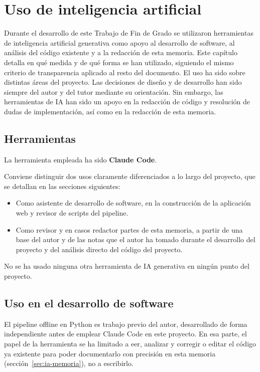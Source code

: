\chapter{Uso de inteligencia artificial}
\label{cap:uso-ia}

Durante el desarrollo de este Trabajo de Fin de Grado se utilizaron
herramientas de inteligencia artificial generativa como apoyo al desarrollo
de software, al análisis del código existente y a la redacción de esta
memoria. Este capítulo detalla en qué medida y de qué forma se
han utilizado, siguiendo el mismo criterio de transparencia aplicado al
resto del documento. El uso ha sido sobre distintas áreas del proyecto. Las 
decisiones de diseño y de desarrollo han sido siempre del autor y del tutor
mediante su orientación. Sin embargo, las herramientas de IA han sido un apoyo en la redacción de código y 
resolución de dudas de implementación, así como en la redacción de esta memoria.

\section{Herramientas}
\label{sec:ia-herramientas}

La herramienta empleada ha sido \textbf{Claude Code}.

Conviene distinguir dos usos claramente diferenciados a lo largo del
proyecto, que se detallan en las secciones siguientes:

\begin{itemize}
  \item Como asistente de desarrollo de software, en la
        construcción de la aplicación web y revisor de scripts del pipeline.
  \item Como revisor y en casos redactor partes de esta memoria, a partir de una base del autor y de las notas
         que el autor ha tomado durante el desarrollo del proyecto y del análisis directo del código del
        proyecto.
\end{itemize}

No se ha usado ninguna otra herramienta de IA generativa en ningún punto del proyecto.

\section{Uso en el desarrollo de software}
\label{sec:ia-desarrollo}

El pipeline offline en Python es trabajo previo del autor, desarrollado de
forma independiente antes de emplear Claude Code en este proyecto. En esa
parte, el papel de la herramienta se ha limitado a eer, analizar y corregir o editar
el código ya existente para poder documentarlo con precisión en esta
memoria (sección~\ref{sec:ia-memoria}), no a escribirlo.

